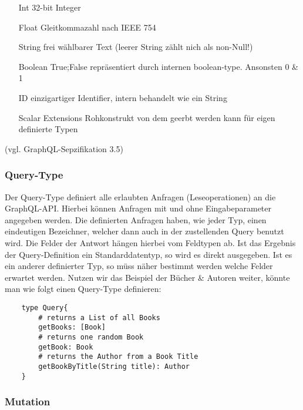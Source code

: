 \begin{center}
    \begin{itemize}
        \item[Int] 32-bit Integer
        \item[Float] Gleitkommazahl nach IEEE 754
        \item[String] frei wählbarer Text (leerer String zählt nich als non-Null!)
        \item[Boolean] True;False repräsentiert durch internen boolean-type. Ansonsten 0 & 1
        \item[ID] einzigartiger Identifier, intern behandelt wie ein String
        \item[Scalar Extensions] Rohkonstrukt von dem geerbt werden kann für eigen definierte Typen
    \end{itemize}
    (vgl. GraphQL-Sepzifikation 3.5)
\end{center}

\subsubsection{Query-Type}

Der Query-Type definiert alle erlaubten Anfragen (Leseoperationen) an die GraphQL-API.
Hierbei können Anfragen mit und ohne Eingabeparameter angegeben werden.
Die definierten Anfragen haben, wie jeder Typ, einen eindeutigen Bezeichner, welcher dann auch in der zustellenden Query
benutzt wird.
Die Felder der Antwort hängen hierbei vom Feldtypen ab. Ist das Ergebnis der Query-Definition ein Standarddatentyp, so wird
es direkt ausgegeben. Ist es ein anderer definierter Typ, so müss näher bestimmt werden welche Felder erwartet werden.
Nutzen wir das Beispiel der Bücher & Autoren weiter, könnte man wie folgt einen Query-Type definieren:

\begin{verbatim}
    type Query{
        # returns a List of all Books
        getBooks: [Book]
        # returns one random Book
        getBook: Book
        # returns the Author from a Book Title
        getBookByTitle(String title): Author
    }
\end{verbatim}


\subsubsection{Mutation}

